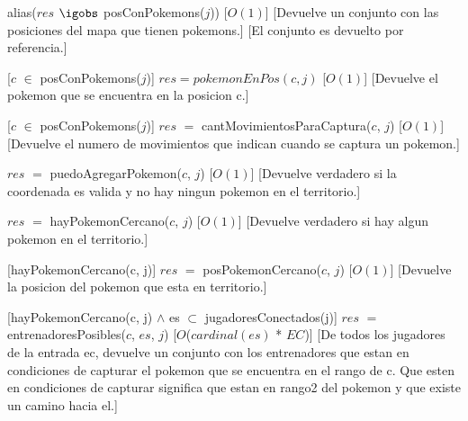 \begin{Interfaz}
%
{alias($res$ $\igobs$ posConPokemons($j$))}%
[$O(1)$] %
[Devuelve un conjunto con las posiciones del mapa que tienen pokemons.]
[El conjunto es devuelto por referencia.]


%
[$c$ $\in$ posConPokemons($j$)]
{$res = pokemonEnPos(c, j)$}%
[$O(1)$] %
[Devuelve el pokemon que se encuentra en la posicion c.]


%
[$c$ $\in$ posConPokemons($j$)] %
{$res$ $=$ cantMovimientosParaCaptura($c$, $j$)}%
[$O(1)$] %
[Devuelve el numero de movimientos que indican cuando se captura un pokemon.]



%
{$res$ $=$ puedoAgregarPokemon($c$, $j$)}  %
[$O(1)$] 
[Devuelve verdadero si la coordenada es valida y no hay ningun pokemon en el territorio.]


%
{$res$ $=$ hayPokemonCercano($c$, $j$)}  %
[$O(1)$] 
[Devuelve verdadero si hay algun pokemon en el territorio.]


%
[hayPokemonCercano(c, j)] 
{$res$ $=$ posPokemonCercano($c$, $j$)}  %
[$O(1)$] 
[Devuelve la posicion del pokemon que esta en territorio.]



%
[hayPokemonCercano(c, j) $\land$ es $\subset$ jugadoresConectados(j)] 
{$res$ $=$ entrenadoresPosibles($c$, $es$, $j$)}  %
[$O$($cardinal(es)$ * $EC$)] 
[De todos los jugadores de la entrada ec, devuelve un conjunto con los entrenadores que estan en condiciones de capturar el pokemon que se encuentra en el rango de c. Que esten en condiciones de capturar significa que estan en rango2 del pokemon y que existe un camino hacia el.]



\end{Interfaz}
